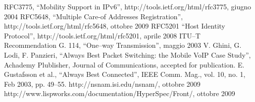 \documentclass[12pt,a4paper,openright,twoside]{book}
\renewcommand{\chaptermark}[1]{\markboth{\thechapter.\ #1}{}}
\begin{document}

\begin{thebibliography}{90}
\rhead[\fancyplain{}{\bfseries \leftmark}]{\fancyplain{}{\bfseries
\thepage}}
 RFC3775, ``Mobility Support in IPv6'',
  http://tools.ietf.org/html/rfc3775, giugno 2004
 RFC5648, ``Multiple Care-of Addresses
  Registration'', http://tools.ietf.org/html/rfc5648, ottobre 2009
 RFC5201 ``Host Identity Protocol'',
  http://tools.ietf.org/html/rfc5201, aprile 2008
 ITU--T Recommendation G. 114, ``One--way
  Transmission'', maggio 2003
 V. Ghini, G. Lodi, F. Panzieri, ``Always Best
  Packet Switching: the Mobile VoIP Case Study'', Achademy Plublisher,
  Journal of Communications, accepted for publication.
 E. Gustafsson et al., ``Always Best Connected'',
  IEEE Comm. Mag., vol. 10, no. 1, Feb 2003, pp. 49--55.
 http://nsnam.isi.edu/nsnam/, ottobre 2009
  http://www.lispworks.com/documentation/HyperSpec/Front/,
  ottobre 2009
\end{thebibliography}
\end{document}
